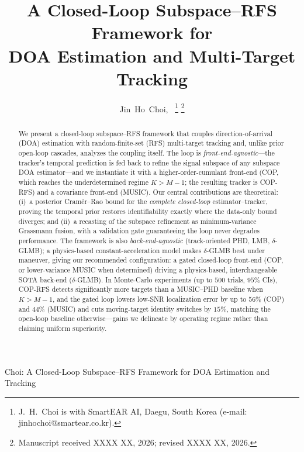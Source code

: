 \documentclass[journal]{IEEEtran}
\begin{document}
\title{A Closed-Loop Subspace--RFS Framework for\\DOA Estimation and Multi-Target Tracking}

\author{Jin~Ho~Choi,~
\thanks{J.~H.~Choi is with SmartEAR AI, Daegu, South Korea (e-mail: jinhochoi@smartear.co.kr).}
\thanks{Manuscript received XXXX XX, 2026; revised XXXX XX, 2026.}}

{Choi: A Closed-Loop Subspace--RFS Framework for DOA Estimation and Tracking}

\maketitle

\begin{abstract}
We present a closed-loop subspace--RFS framework that couples direction-of-arrival (DOA) estimation with random-finite-set (RFS) multi-target tracking and, unlike prior open-loop cascades, analyzes the coupling itself. The loop is \emph{front-end-agnostic}---the tracker's temporal prediction is fed back to refine the signal subspace of any subspace DOA estimator---and we instantiate it with a higher-order-cumulant front-end (COP, which reaches the underdetermined regime $K>M{-}1$; the resulting tracker is COP-RFS) and a covariance front-end (MUSIC). Our central contributions are theoretical: (i)~a posterior Cram\'{e}r--Rao bound for the \emph{complete closed-loop} estimator--tracker, proving the temporal prior restores identifiability exactly where the data-only bound diverges; and (ii)~a recasting of the subspace refinement as minimum-variance Grassmann fusion, with a validation gate guaranteeing the loop never degrades performance. The framework is also \emph{back-end-agnostic} (track-oriented PHD, LMB, $\delta$-GLMB); a physics-based constant-acceleration model makes $\delta$-GLMB best under maneuver, giving our recommended configuration: a gated closed-loop front-end (COP, or lower-variance MUSIC when determined) driving a physics-based, interchangeable SOTA back-end ($\delta$-GLMB). In Monte-Carlo experiments (up to $500$ trials, $95\%$ CIs), COP-RFS detects significantly more targets than a MUSIC--PHD baseline when $K>M{-}1$, and the gated loop lowers low-SNR localization error by up to $56\%$ (COP) and $44\%$ (MUSIC) and cuts moving-target identity switches by $15\%$, matching the open-loop baseline otherwise---gains we delineate by operating regime rather than claiming uniform superiority.
\end{abstract}
\end{document}
